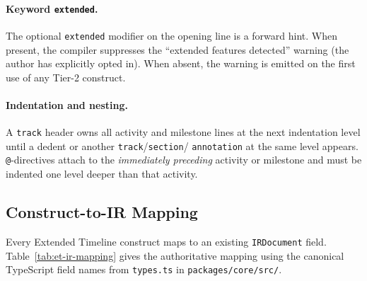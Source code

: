\paragraph{Keyword \texttt{extended}.}  The optional \texttt{extended}
modifier on the opening line is a forward hint.  When present, the compiler
suppresses the ``extended features detected'' warning (the author has
explicitly opted in).  When absent, the warning is emitted on the first use
of any Tier-2 construct.

\paragraph{Indentation and nesting.}
A \texttt{track} header owns all activity and milestone lines at the next
indentation level until a dedent or another \texttt{track}/\texttt{section}/
\texttt{annotation} at the same level appears.  \texttt{@}-directives attach
to the \emph{immediately preceding} activity or milestone and must be
indented one level deeper than that activity.

\subsection{Construct-to-IR Mapping}
\label{sec:et-ir-mapping}

Every Extended Timeline construct maps to an existing \texttt{IRDocument}
field.  Table~\ref{tab:et-ir-mapping} gives the authoritative mapping using
the canonical TypeScript field names from \texttt{types.ts} in
\texttt{packages/core/src/}.

